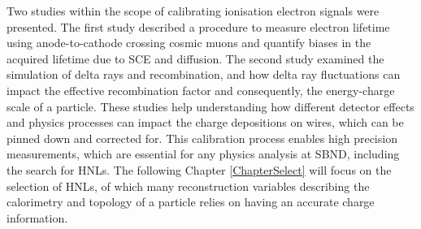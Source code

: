 Two studies within the scope of calibrating ionisation electron signals were presented. 
The first study described a procedure to measure electron lifetime using anode-to-cathode crossing cosmic muons and quantify biases in the acquired lifetime due to SCE and diffusion. 
The second study examined the simulation of delta rays and recombination, and how delta ray fluctuations can impact the effective recombination factor and consequently, the energy-charge scale of a particle.
These studies help understanding how different detector effects and physics processes can impact the charge depositions on wires, which can be pinned down and corrected for.
This calibration process enables high precision measurements, which are essential for any physics analysis at SBND, including the search for HNLs.
The following Chapter \ref{ChapterSelect} will focus on the selection of HNLs, of which many reconstruction variables describing the calorimetry and topology of a particle relies on having an accurate charge information. 

